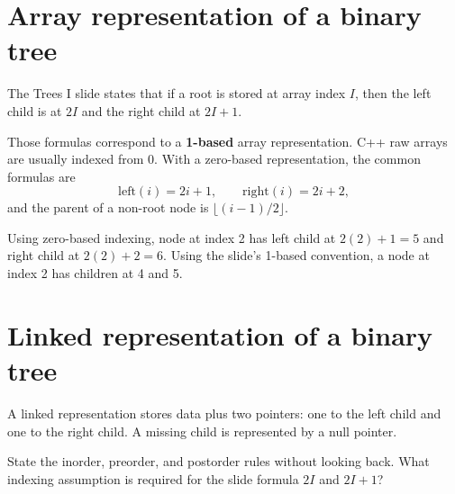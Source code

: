 \section{Array representation of a binary tree}

The Trees I slide states that if a root is stored at array index $I$, then the left child is at $2I$ and the right child at $2I+1$.

\begin{clarification}
Those formulas correspond to a \textbf{1-based} array representation. C++ raw arrays are usually indexed from 0. With a zero-based representation, the common formulas are
\[
\text{left}(i)=2i+1,\qquad \text{right}(i)=2i+2,
\]
and the parent of a non-root node is $\lfloor(i-1)/2\rfloor$.
\end{clarification}

\begin{workedexample}
Using zero-based indexing, node at index 2 has left child at $2(2)+1=5$ and right child at $2(2)+2=6$. Using the slide's 1-based convention, a node at index 2 has children at 4 and 5.
\end{workedexample}

\section{Linked representation of a binary tree}

A linked representation stores data plus two pointers: one to the left child and one to the right child. A missing child is represented by a null pointer.

\begin{mlfigure}
\end{mlfigure}

\begin{quickcheck}
State the inorder, preorder, and postorder rules without looking back. What indexing assumption is required for the slide formula $2I$ and $2I+1$?
\end{quickcheck}

